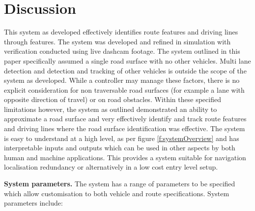 \documentclass[]{aiaa-tc}%
\begin{document}
\section{Discussion} \label{s:discussion}

This system as developed effectively identifies route features and driving lines through features. The system was developed and refined in simulation with verification conducted using live dashcam footage. The system outlined in this paper specifically assumed a single road surface with no other vehicles. Multi lane detection and detection and tracking of other vehicles is outside the scope of the system as developed. While a controller may manage these factors, there is no explicit consideration for non traversable road surfaces (for example a lane with opposite direction of travel) or on road obstacles. Within these specified limitations however, the system as outlined demonstrated an ability to approximate a road surface and very effectively identify and track route features and driving lines where the road surface identification was effective. The system is easy to understand at a high level, as per figure \ref{f:systemOverview} and has interpretable inputs and outputs which can be used in other aspects by both human and machine applications. This provides a system suitable for navigation localisation redundancy or alternatively in a low cost entry level setup.

\textbf{System parameters.} The system has a range of parameters to be specified which allow customisation to both vehicle and route specifications. System parameters include: 
\end{document}

